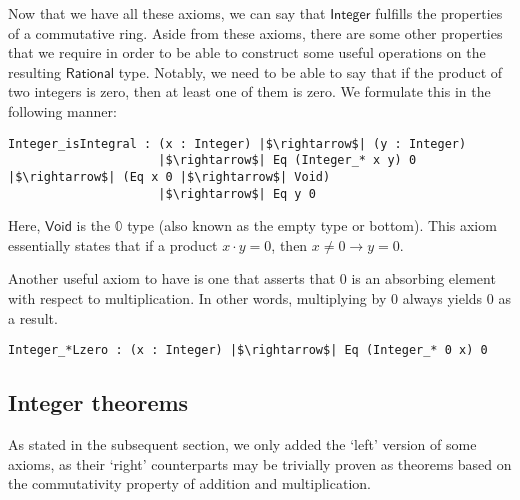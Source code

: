 \documentclass[12pt,twoside,maitrise]{dms}
\theoremstyle{definition}
\numberwithin{equation}{section}
\numberwithin{table}{chapter}
\numberwithin{figure}{chapter}
\newcommand\kw[1] {\textsf{#1}}
\begin{document}
Now that we have all these axioms, we can say that $\kw{Integer}$ fulfills the properties of a commutative ring. Aside from these axioms, there are some other properties that we require in order to be able to construct some useful operations on the resulting $\kw{Rational}$ type. Notably, we need to be able to say that if the product of two integers is zero, then at least one of them is zero. We formulate this in the following manner:

\begin{verbatim}
Integer_isIntegral : (x : Integer) |$\rightarrow$| (y : Integer)
                     |$\rightarrow$| Eq (Integer_* x y) 0 |$\rightarrow$| (Eq x 0 |$\rightarrow$| Void)
                     |$\rightarrow$| Eq y 0
\end{verbatim}

Here, $\kw{Void}$ is the $\mathbb{0}$ type (also known as the empty type or bottom). This axiom essentially states that if a product $x \cdot y = 0$, then $x \ne 0 \rightarrow y = 0$.

Another useful axiom to have is one that asserts that 0 is an absorbing element with respect to multiplication. In other words, multiplying by 0 always yields 0 as a result.

\begin{verbatim}
Integer_*Lzero : (x : Integer) |$\rightarrow$| Eq (Integer_* 0 x) 0
\end{verbatim}

\subsection*{Integer theorems}\label{subsection:int-theorems}
As stated in the subsequent section, we only added the `left' version of some
axioms, as their `right' counterparts may be trivially proven as theorems based
on the commutativity property of addition and multiplication.
\end{document}

